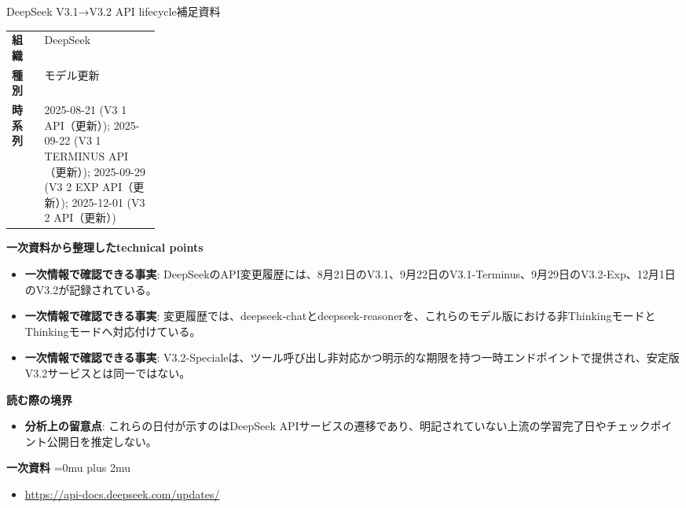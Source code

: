 \begin{technicalnote}{DeepSeek V3.1→V3.2 API lifecycle}{補足資料}
\begingroup
\begin{tabularx}{\linewidth}{@{}>{\bfseries}p{0.22\linewidth}X@{}}
組織 & DeepSeek \\
種別 & モデル更新 \\
時系列 & 2025-08-21 (V3 1 API（更新）); 2025-09-22 (V3 1 TERMINUS API（更新）); 2025-09-29 (V3 2 EXP API（更新）); 2025-12-01 (V3 2 API（更新）) \\
\end{tabularx}
\smallskip
{\bfseries 一次資料から整理したtechnical points}
\begin{itemize}[leftmargin=1.5em,itemsep=0.35em]
\item \textbf{一次情報で確認できる事実}: DeepSeekのAPI変更履歴には、8月21日のV3.1、9月22日のV3.1-Terminus、9月29日のV3.2-Exp、12月1日のV3.2が記録されている。
\item \textbf{一次情報で確認できる事実}: 変更履歴では、deepseek-chatとdeepseek-reasonerを、これらのモデル版における非ThinkingモードとThinkingモードへ対応付けている。
\item \textbf{一次情報で確認できる事実}: V3.2-Specialeは、ツール呼び出し非対応かつ明示的な期限を持つ一時エンドポイントで提供され、安定版V3.2サービスとは同一ではない。
\end{itemize}
\begin{minipage}{\linewidth}
{\bfseries 読む際の境界}
\begin{itemize}[leftmargin=1.5em,itemsep=0.35em]
\item \textbf{分析上の留意点}: これらの日付が示すのはDeepSeek APIサービスの遷移であり、明記されていない上流の学習完了日やチェックポイント公開日を推定しない。
\end{itemize}
\begin{samepage}
{\bfseries 一次資料}
\begingroup\sloppy
\Urlmuskip=0mu plus 2mu\relax
\begin{itemize}[leftmargin=1.5em,itemsep=0.25em]
\item {\scriptsize\url{https://api-docs.deepseek.com/updates/}}
\end{itemize}
\endgroup
\end{samepage}
\end{minipage}
\endgroup
\end{technicalnote}
\medskip

